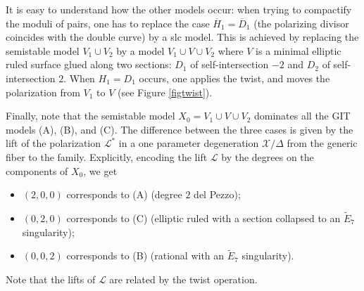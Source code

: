 \documentclass{amsart}
\numberwithin{equation}{section}
\theoremstyle{plain}
\theoremstyle{remark}
\theoremstyle{definition}
\newcommand{\calL}{\mathcal{L}}
\newcommand{\sX}{\mathscr{X}}
\newcommand{\Es}{\widetilde{E}_7}
\newcommand{\oD}{\overline{D}}
\newcommand{\oH}{\overline{H}}
\begin{document}
It is easy to understand how the other models occur:  when trying to compactify the moduli of pairs, one has to replace the case $\oH_1=\oD_1$ (the polarizing divisor coincides with the double curve) by a slc model.  This is achieved by replacing the semistable model $V_1\cup V_2$ by a model $V_1\cup V\cup V_2$ where $V$ is a minimal elliptic ruled surface glued along two sections: $D_{1}$ of self-intersection $-2$ and $D_{2}$ of self-intersection $2$. When $H_1=D_1$ occurs, one applies the twist, and moves the polarization from $V_1$ to $V$ (see Figure \ref{figtwist}).  

Finally, note that the semistable model $X_0=V_1\cup V\cup V_2$ dominates all the GIT models (A), (B), and (C). The difference between the three cases is given by the lift of the polarization $\calL^*$ in a one parameter degeneration $\sX/\Delta$ from the generic fiber to the family.  Explicitly, encoding the lift $\calL$ by the degrees on the components of $X_0$, we get
\begin{itemize}
\item $(2,0,0)$ corresponds to (A) (degree $2$ del Pezzo);
\item $(0,2,0)$ corresponds to (C) (elliptic ruled with a section collapsed to an $\Es$ singularity);
\item $(0,0,2)$ corresponds to (B) (rational with an $\Es$ singularity). 
\end{itemize}
Note that the lifts of $\calL$ are related by the twist operation. 
\end{document}
